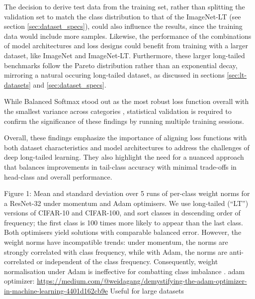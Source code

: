 The decision to derive test data from the training set, rather than splitting the validation set to match the class distribution to that of the ImageNet-LT (see section \ref{sec:dataset_specs}), could also influence the results, since the training data would include more samples. Likewise, the performance of the combinations of model architectures and loss designs could benefit from training with a larger dataset, like ImageNet and ImageNet-LT. Furthermore, these larger long-tailed benchmarks follow the Pareto distribution rather than an exponential decay, mirroring a natural occuring long-tailed dataset, as discussed in sections \ref{sec:lt-datasets} and \ref{sec:dataset_specs}.  

While Balanced Softmax stood out as the most robust loss function overall with the smallest variance across categories , statistical validation is required to confirm the significance of these findings by running multiple training sessions.

Overall, these findings emphasize the importance of aligning loss functions with both dataset characteristics and model architectures to address the challenges of deep long-tailed learning. They also highlight the need for a nuanced approach that balances improvements in tail-class accuracy with minimal trade-offs in head-class and overall performance.

Figure 1: Mean and standard deviation over 5 runs of per-class weight norms for a ResNet-32 under
momentum and Adam optimisers. We use long-tailed (“LT”) versions of CIFAR-10 and CIFAR-100,
and sort classes in descending order of frequency; the first class is 100 times more likely to appear
than the last class. Both optimisers yield solutions with comparable balanced error. However, the
weight norms have incompatible trends: under momentum, the norms are strongly correlated with
class frequency, while with Adam, the norms are anti-correlated or independent of the class frequency.
Consequently, weight normalisation under Adam is ineffective for combatting class imbalance \cite{menon2021longtaillearninglogitadjustment}.
adam optimizer: 
\url{https://medium.com/@weidagang/demystifying-the-adam-optimizer-in-machine-learning-4401d162cb9e}
Useful for large datasets \cite{kingma2017adammethodstochasticoptimization}

